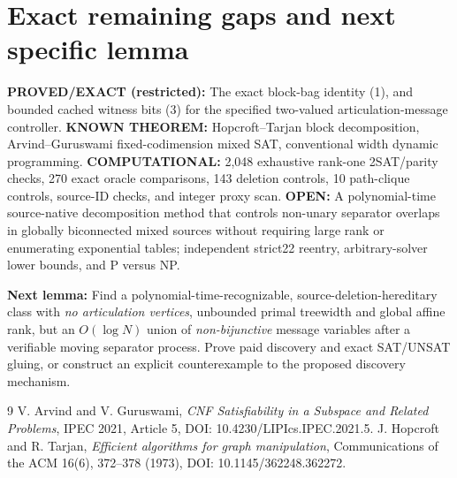 \documentclass[10pt]{article}
\begin{document}
\section{Exact remaining gaps and next specific lemma}
\noindent\textbf{PROVED/EXACT (restricted):} The exact block-bag identity (1), and bounded cached witness bits (3) for the specified two-valued articulation-message controller. \textbf{KNOWN THEOREM:} Hopcroft--Tarjan block decomposition, Arvind--Guruswami fixed-codimension mixed SAT, conventional width dynamic programming. \textbf{COMPUTATIONAL:} 2,048 exhaustive rank-one 2SAT/parity checks, 270 exact oracle comparisons, 143 deletion controls, 10 path-clique controls, source-ID checks, and integer proxy scan. \textbf{OPEN:} A polynomial-time source-native decomposition method that controls non-unary separator overlaps in globally biconnected mixed sources without requiring large rank or enumerating exponential tables; independent strict22 reentry, arbitrary-solver lower bounds, and P versus NP.

\noindent\textbf{Next lemma:} Find a polynomial-time-recognizable, source-deletion-hereditary class with \emph{no articulation vertices}, unbounded primal treewidth and global affine rank, but an $O(\log N)$ union of \emph{non-bijunctive} message variables after a verifiable moving separator process. Prove paid discovery and exact SAT/UNSAT gluing, or construct an explicit counterexample to the proposed discovery mechanism.

\begin{thebibliography}{9}
 V. Arvind and V. Guruswami, \emph{CNF Satisfiability in a Subspace and Related Problems}, IPEC 2021, Article 5, DOI: 10.4230/LIPIcs.IPEC.2021.5.
 J. Hopcroft and R. Tarjan, \emph{Efficient algorithms for graph manipulation}, Communications of the ACM 16(6), 372--378 (1973), DOI: 10.1145/362248.362272.
\end{thebibliography}
\end{document}
